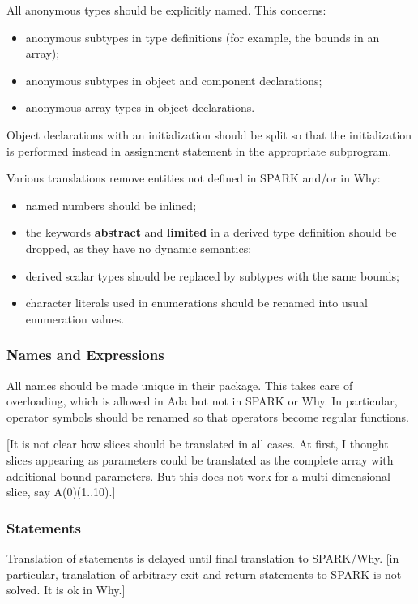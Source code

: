 \documentclass{article}
\newcounter{example}
\newcommand{\kw}[1]{\textbf{#1}}
\begin{document}
All anonymous types should be explicitly named. This concerns:
\begin{itemize}
\item anonymous subtypes in type definitions (for example, the bounds in an
  array);
\item anonymous subtypes in object and component declarations;
\item anonymous array types in object declarations.
\end{itemize}

Object declarations with an initialization should be split so that the
initialization is performed instead in assignment statement in the appropriate
subprogram.

Various translations remove entities not defined in SPARK and/or in Why:
\begin{itemize}
\item named numbers should be inlined;
\item the keywords \kw{abstract} and \kw{limited} in a derived type definition
  should be dropped, as they have no dynamic semantics;
\item derived scalar types should be replaced by subtypes with the same bounds;
\item character literals used in enumerations should be renamed into usual
  enumeration values.
\end{itemize}

\subsubsection{Names and Expressions}

All names should be made unique in their package. This takes care of
overloading, which is allowed in Ada but not in SPARK or Why. In particular,
operator symbols should be renamed so that operators become regular functions.

[It is not clear how slices should be translated in all cases. At first, I
thought slices appearing as parameters could be translated as the complete
array with additional bound parameters. But this does not work for a
multi-dimensional slice, say A(0)(1..10).]

\subsubsection{Statements}

Translation of statements is delayed until final translation to SPARK/Why. [in
particular, translation of arbitrary exit and return statements to SPARK is not
solved. It is ok in Why.]
\end{document}
